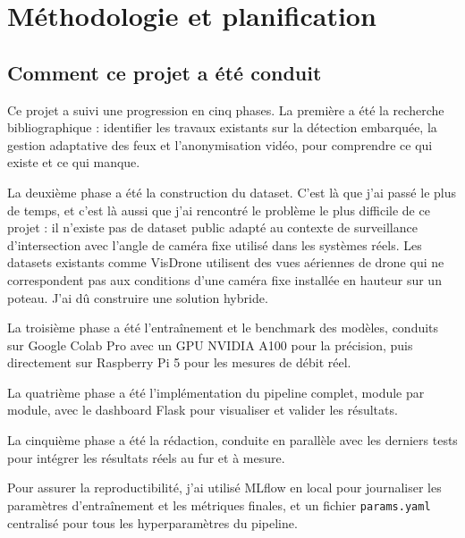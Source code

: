 \section{Méthodologie et planification}

\subsection{Comment ce projet a été conduit}

Ce projet a suivi une progression en cinq
phases. La première a été la recherche
bibliographique : identifier les travaux
existants sur la détection embarquée, la
gestion adaptative des feux et l'anonymisation
vidéo, pour comprendre ce qui existe et
ce qui manque.

La deuxième phase a été la construction
du dataset. C'est là que j'ai passé le
plus de temps, et c'est là aussi que j'ai
rencontré le problème le plus difficile
de ce projet : il n'existe pas de dataset
public adapté au contexte de surveillance
d'intersection avec l'angle de caméra fixe
utilisé dans les systèmes réels. Les
datasets existants comme VisDrone utilisent
des vues aériennes de drone qui ne
correspondent pas aux conditions d'une
caméra fixe installée en hauteur sur un
poteau. J'ai dû construire une solution
hybride.

La troisième phase a été l'entraînement
et le benchmark des modèles, conduits
sur Google Colab Pro avec un GPU NVIDIA
A100 pour la précision, puis directement
sur Raspberry Pi 5 pour les mesures de
débit réel.

La quatrième phase a été l'implémentation
du pipeline complet, module par module,
avec le dashboard Flask pour visualiser
et valider les résultats.

La cinquième phase a été la rédaction,
conduite en parallèle avec les derniers
tests pour intégrer les résultats réels
au fur et à mesure.

Pour assurer la reproductibilité, j'ai
utilisé MLflow en local pour journaliser
les paramètres d'entraînement et les
métriques finales, et un fichier
\texttt{params.yaml} centralisé pour
tous les hyperparamètres du pipeline.

